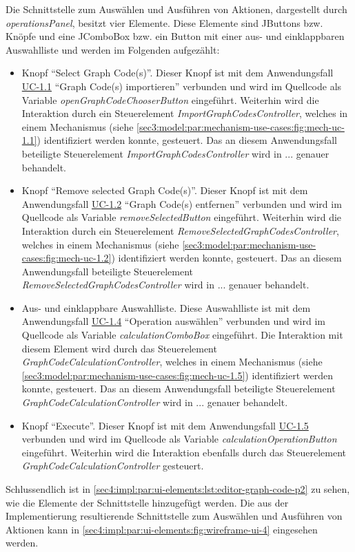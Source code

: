Die Schnittstelle zum Auswählen und Ausführen von Aktionen, dargestellt durch \textit{operationsPanel}, besitzt vier Elemente.
Diese Elemente sind JButtons bzw. Knöpfe und eine JComboBox bzw. ein Button mit einer aus- und einklappbaren Auswahlliste und werden im Folgenden aufgezählt:
\begin{itemize}
  \item Knopf \enquote{Select Graph Code(s)}.
  Dieser Knopf ist mit dem Anwendungsfall \hyperref[sec3:model:uc-1.1]{UC-1.1} \enquote{Graph Code(s) importieren} verbunden und wird im Quellcode als Variable \textit{openGraphCodeChooserButton} eingeführt.
  Weiterhin wird die Interaktion durch ein Steuerelement \textit{ImportGraphCodesController}, welches in einem Mechanismus (siehe \cref{sec3:model:par:mechanism-use-cases:fig:mech-uc-1.1}) identifiziert werden konnte, gesteuert.
  Das an diesem Anwendungsfall beteiligte Steuerelement \textit{ImportGraphCodesController} wird in ... genauer behandelt.
  \item Knopf \enquote{Remove selected Graph Code(s)}.
  Dieser Knopf ist mit dem Anwendungsfall \hyperref[sec3:model:uc-1.2]{UC-1.2} \enquote{Graph Code(s) entfernen} verbunden und wird im Quellcode als Variable \textit{removeSelectedButton} eingeführt.
  Weiterhin wird die Interaktion durch ein Steuerelement \textit{RemoveSelectedGraphCodesController}, welches in einem Mechanismus (siehe \cref{sec3:model:par:mechanism-use-cases:fig:mech-uc-1.2}) identifiziert werden konnte, gesteuert.
  Das an diesem Anwendungsfall beteiligte Steuerelement \textit{RemoveSelectedGraphCodesController} wird in ... genauer behandelt.
  \item Aus- und einklappbare Auswahlliste.
  Diese Auswahlliste ist mit dem Anwendungsfall \hyperref[sec3:model:uc-1.4]{UC-1.4} \enquote{Operation auswählen} verbunden und wird im Quellcode als Variable \textit{calculationComboBox} eingeführt.
  Die Interaktion mit diesem Element wird durch das Steuerelement \textit{GraphCodeCalculationController}, welches in einem Mechanismus (siehe \cref{sec3:model:par:mechanism-use-cases:fig:mech-uc-1.5}) identifiziert werden konnte, gesteuert.
  Das an diesem Anwendungsfall beteiligte Steuerelement \textit{GraphCodeCalculationController} wird in ... genauer behandelt.
  \item Knopf \enquote{Execute}.
  Dieser Knopf ist mit dem Anwendungsfall \hyperref[sec3:model:uc-1.5]{UC-1.5} verbunden und wird im Quellcode als Variable \textit{calculationOperationButton} eingeführt.
  Weiterhin wird die Interaktion ebenfalls durch das Steuerelement \textit{GraphCodeCalculationController} gesteuert.
\end{itemize}
Schlussendlich ist in \cref{sec4:impl:par:ui-elements:lst:editor-graph-code-p2} zu sehen, wie die Elemente der Schnittstelle hinzugefügt werden.
Die aus der Implementierung resultierende Schnittstelle zum Auswählen und Ausführen von Aktionen kann in \cref{sec4:impl:par:ui-elements:fig:wireframe-ui-4} eingesehen werden.

